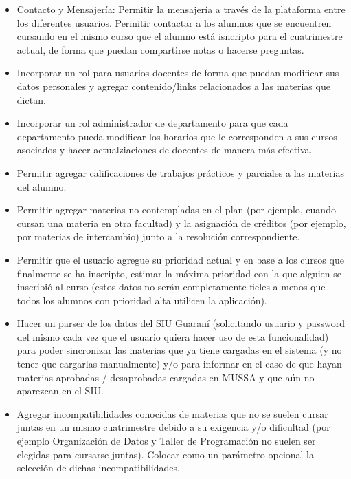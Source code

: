 \documentclass[a4paper]{article}
\begin{document}
\begin{itemize}
	\item Contacto y Mensajería: Permitir la mensajería a través de la plataforma entre los diferentes usuarios. Permitir contactar a los alumnos que se encuentren cursando en el mismo curso que el alumno está isncripto para el cuatrimestre actual, de forma que puedan compartirse notas o hacerse preguntas.
	
	\item Incorporar un rol para usuarios docentes de forma que puedan modificar sus datos personales y agregar contenido/links relacionados a las materias que dictan.

	\item Incorporar un rol administrador de departamento para que cada departamento pueda modificar los horarios que le corresponden a sus cursos asociados y hacer actualziaciones de docentes de manera más efectiva.
	
	\item Permitir agregar calificaciones de trabajos prácticos y parciales a las materias del alumno.
	
	\item Permitir agregar materias no contempladas en el plan (por ejemplo, cuando cursan una materia en otra facultad) y la asignación de créditos (por ejemplo, por materias de intercambio) junto a la resolución correspondiente.
	
	\item Permitir que el usuario agregue su prioridad actual y en base a los cursos que finalmente se ha inscripto, estimar la máxima prioridad con la que alguien se inscribió al curso (estos datos no serán completamente fieles a menos que todos los alumnos con prioridad alta utilicen la aplicación).
	
	\item Hacer un parser de los datos del SIU Guaraní (solicitando usuario y password del mismo cada vez que el usuario quiera hacer uso de esta funcionalidad) para poder sincronizar las materias que ya tiene cargadas en el sistema (y no tener que cargarlas manualmente) y/o para informar en el caso de que hayan materias aprobadas / desaprobadas cargadas en MUSSA y que aún no aparezcan en el SIU.
	
	\item Agregar incompatibilidades conocidas de materias que no se suelen cursar juntas en un mismo cuatrimestre debido a su exigencia y/o dificultad (por ejemplo Organización de Datos y Taller de Programación no suelen ser elegidas para cursarse juntas). Colocar como un parámetro opcional la selección de dichas incompatibilidades.

\end{itemize}
\end{document}
